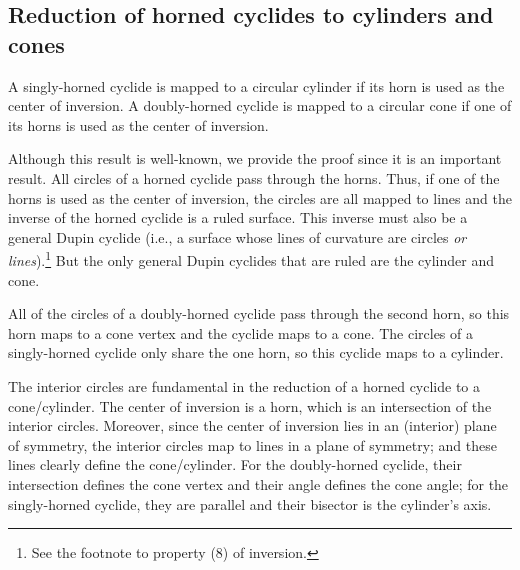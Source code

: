 \subsection{Reduction of horned cyclides to cylinders and cones}
\label{sec:tocyl}

\begin{lemma}
\label{lem:horn}
A singly-horned cyclide is mapped to a circular cylinder 
if its horn is used as the center of inversion.
A doubly-horned cyclide is mapped to a circular cone
if one of its horns is used as the center of inversion.
\end{lemma}
\prf
Although this result is well-known, 
we provide the proof since it is an important result.
All circles of a horned cyclide pass through the horns.
Thus, if one of the horns is used as the center of inversion,
the circles are all mapped to lines and 
the inverse of the horned cyclide is a ruled surface.
This inverse must also be a general
Dupin cyclide (i.e., a surface whose lines of curvature are circles 
{\em or lines}).\footnote{See the footnote to property (8) of inversion.}
But the only general Dupin cyclides that are ruled are the cylinder and cone.

All of the circles of a doubly-horned cyclide pass through the second horn,
so this horn maps to a cone vertex and the cyclide maps to a cone.
The circles of a singly-horned cyclide only share the one horn,
so this cyclide maps to a cylinder.
\QED

\begin{rmk}
\label{rmk:interior}
The interior circles are fundamental in the reduction of a horned cyclide
to a cone/cylinder.
The center of inversion is a horn, which is an intersection of the interior
circles.
Moreover, since the center of inversion lies in an (interior) plane of
symmetry, the interior circles map to lines in a plane of symmetry;
and these lines clearly define the cone/cylinder.
For the doubly-horned cyclide, their intersection defines the cone vertex
and their angle defines the cone angle;
for the singly-horned cyclide, they are parallel and their bisector
is the cylinder's axis.
\end{rmk}


